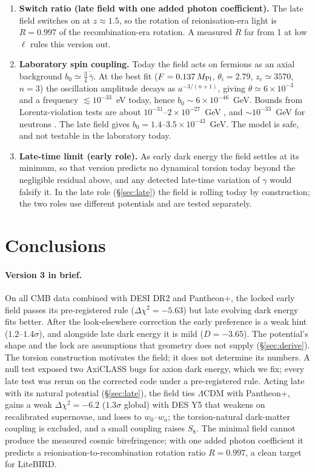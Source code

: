 \documentclass[11pt]{article}
\newcommand{\Mp}{M_{\rm Pl}}
\newcommand{\AthreeD}{\ensuremath{-3.65}}  %
\begin{document}
\begin{enumerate}
decide. This is an effective-field-theory estimate; the Jackiw--Kosteleck\'y regularisation ambiguity of an
induced Chern--Simons term is not resolved here.
\item \textbf{Switch ratio (late field with one added photon coefficient).} The late field switches on at
$z\approx1.5$, so the rotation of reionisation-era light is $R=0.997$ of the recombination-era rotation. A
measured $R$ far from 1 at low $\ell$ rules this version out.
\item \textbf{Laboratory spin coupling.} Today the field acts on fermions as an axial
background $b_0\simeq\frac34\,\dot{\bar\gamma}$. At the best fit ($F=0.137\,\Mp$,
$\theta_i=2.79$, $z_c\simeq3570$, $n=3$) the oscillation amplitude decays as $a^{-3/(n+1)}$,
giving $\theta\simeq6\times10^{-3}$ and a frequency $\lesssim10^{-33}$~eV today, hence
$b_0\sim6\times10^{-46}$~GeV. Bounds from Lorentz-violation tests are about
$10^{-31}$--$2\times10^{-27}$~GeV \cite{kostelecky2008}, and $\sim10^{-33}$~GeV for neutrons
\cite{brown2010}. The late field gives $b_0=1.4$--$3.5\times10^{-43}$~GeV. The model is safe, and not
testable in the laboratory today.
\item \textbf{Late-time limit (early role).} As early dark energy the field settles at its minimum, so that
version predicts no dynamical torsion today beyond the negligible residual above, and any detected late-time
variation of $\gamma$ would falsify it. In the late role (\S\ref{sec:late}) the field is rolling today by
construction; the two roles use different potentials and are tested separately.
\end{enumerate}

\section{Conclusions}
\paragraph{Version 3 in brief.} On all CMB data combined with DESI DR2 and Pantheon+, the locked early field passes
its pre-registered rule ($\Delta\chi^2=-5.63$) but late evolving dark energy fits better. After the look-elsewhere
correction the early preference is a weak hint ($1.2$--$1.4\sigma$), and alongside late dark energy it is mild
($D=\AthreeD$). The potential's shape and the lock are assumptions that geometry does not supply
(\S\ref{sec:derive}). The torsion construction motivates the field; it does not determine its numbers. A null test
exposed two AxiCLASS bugs for axion dark energy, which we fix; every late test was rerun on the corrected code under a
pre-registered rule. Acting late with its natural potential (\S\ref{sec:late}), the field ties $\Lambda$CDM with
Pantheon+, gains a weak $\Delta\chi^2=-6.2$ ($1.3\sigma$ global) with DES Y5 that weakens on recalibrated supernovae,
and loses to $w_0$--$w_a$; the torsion-natural dark-matter coupling is excluded, and a small coupling raises $S_8$. The
minimal field cannot produce the measured cosmic birefringence; with one added photon coefficient it predicts a
reionisation-to-recombination rotation ratio $R=0.997$, a clean target for LiteBIRD.
\end{document}
